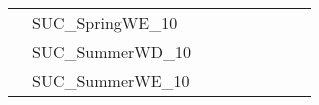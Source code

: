 \begin{table}[]
{\begin{tabular}{|c|l|l|l|l|l|l|l|l|}
			& SUC\_SpringWE\_10             &                                    &                                  &                            &                          &                                         &                                 &                                \\
			& SUC\_SummerWD\_10             &                                    &                                  &                            &                          &                                         &                                 &                                \\
			& SUC\_SummerWE\_10             &                                    &                                  &                            &                          &                                         &                                 &                                \\ \hline
		\end{tabular}%
	}
\end{table}